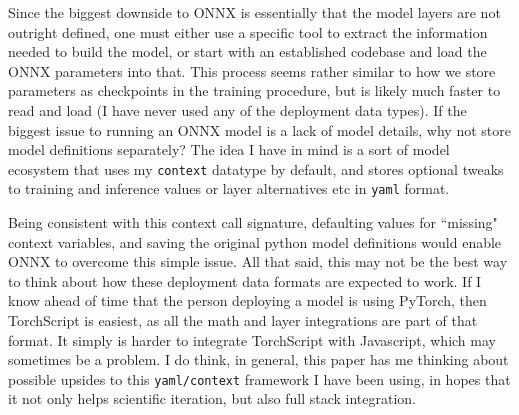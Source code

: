 \documentclass{article}
\begin{document}
Since the biggest downside to ONNX is essentially that the model layers are not outright defined, one must either use a specific tool to extract the information needed to build the model, or start with an established codebase and load the ONNX parameters into that.
This process seems rather similar to how we store parameters as checkpoints in the training procedure, but is likely much faster to read and load (I have never used any of the deployment data types).
If the biggest issue to running an ONNX model is a lack of model details, why not store model definitions separately?
The idea I have in mind is a sort of model ecosystem that uses my \texttt{context} datatype by default, and stores optional tweaks to training and inference values or layer alternatives etc in \texttt{yaml} format. 

Being consistent with this context call signature, defaulting values for ``missing" context variables, and saving the original python model definitions would enable ONNX to overcome this simple issue.
All that said, this may not be the best way to think about how these deployment data formats are expected to work.
If I know ahead of time that the person deploying a model is using PyTorch, then TorchScript is easiest, as all the math and layer integrations are part of that format.
It simply is harder to integrate TorchScript with Javascript, which may sometimes be a problem.
I do think, in general, this paper has me thinking about possible upsides to this \texttt{yaml/context} framework I have been using, in hopes that it not only helps scientific iteration, but also full stack integration.
\end{document}
